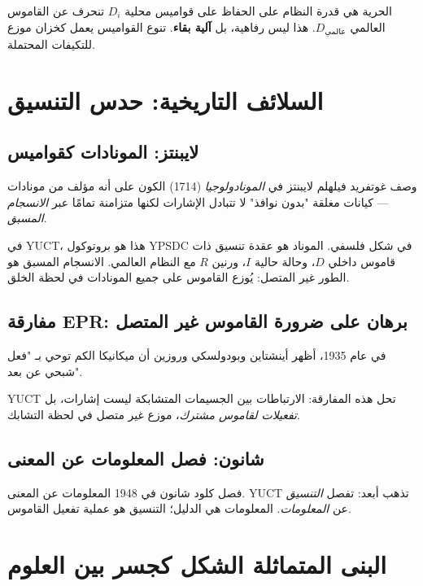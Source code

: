 \documentclass[11pt,a4paper]{article}
\begin{document}
	الحرية هي قدرة النظام على الحفاظ على قواميس محلية \(D_i\) تنحرف عن القاموس العالمي \(D_{\text{عالمي}}\). هذا ليس رفاهية، بل \textbf{آلية بقاء}. تنوع القواميس يعمل كخزان موزع للتكيفات المحتملة.
	
	\section{السلائف التاريخية: حدس التنسيق}
	
	\subsection{لايبنتز: المونادات كقواميس}
	
	وصف غوتفريد فيلهلم لايبنتز في \emph{المونادولوجيا} (1714) الكون على أنه مؤلف من مونادات — كيانات مغلقة "بدون نوافذ" لا تتبادل الإشارات لكنها متزامنة تمامًا عبر \emph{الانسجام المسبق}.
	
	في YUCT، هذا هو بروتوكول YPSDC في شكل فلسفي. الموناد هو عقدة تنسيق ذات قاموس داخلي \(D\)، وحالة حالية \(I\)، ورنين \(R\) مع النظام العالمي. الانسجام المسبق هو الطور غير المتصل: يُوزع القاموس على جميع المونادات في لحظة الخلق.
	
	\subsection{مفارقة EPR: برهان على ضرورة القاموس غير المتصل}
	
	في عام 1935، أظهر أينشتاين وبودولسكي وروزين أن ميكانيكا الكم توحي بـ "فعل شبحي عن بعد".
	
	YUCT تحل هذه المفارقة: الارتباطات بين الجسيمات المتشابكة ليست إشارات، بل \emph{تفعيلات لقاموس مشترك}، موزع غير متصل في لحظة التشابك.
	
	\subsection{شانون: فصل المعلومات عن المعنى}
	
	فصل كلود شانون في 1948 المعلومات عن المعنى. YUCT تذهب أبعد: تفصل \emph{التنسيق} عن \emph{المعلومات}. المعلومات هي الدليل؛ التنسيق هو عملية تفعيل القاموس.
	
	\section{البنى المتماثلة الشكل كجسر بين العلوم}
	\label{sec:isomorphisms}
	
\end{document}
